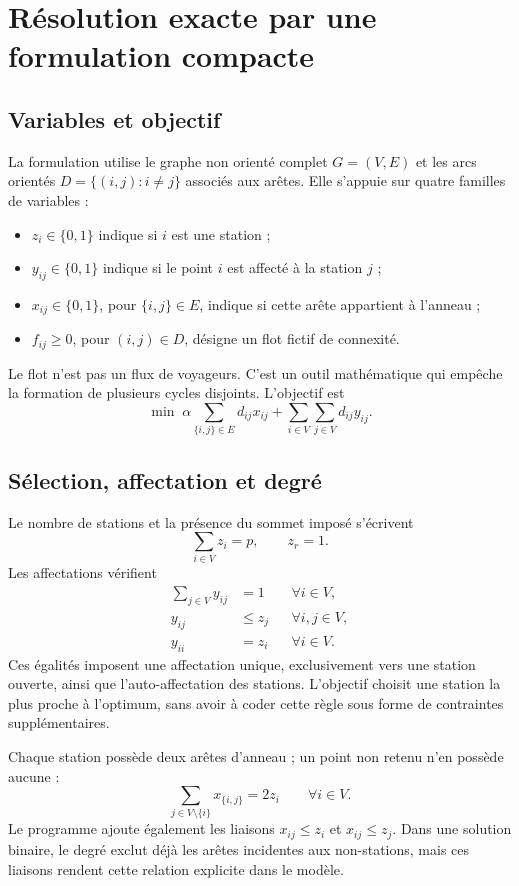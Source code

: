 \chapter{Résolution exacte par une formulation compacte}
\section{Variables et objectif}
La formulation utilise le graphe non orienté complet $G=(V,E)$ et les arcs
orientés $D=\{(i,j):i\ne j\}$ associés aux arêtes. Elle s'appuie sur quatre
familles de variables :
\begin{itemize}
\item $z_i\in\{0,1\}$ indique si $i$ est une station ;
\item $y_{ij}\in\{0,1\}$ indique si le point $i$ est affecté à la station $j$ ;
\item $x_{ij}\in\{0,1\}$, pour $\{i,j\}\in E$, indique si cette arête appartient à l'anneau ;
\item $f_{ij}\geq0$, pour $(i,j)\in D$, désigne un flot fictif de connexité.
\end{itemize}
Le flot n'est pas un flux de voyageurs. C'est un outil mathématique qui empêche
la formation de plusieurs cycles disjoints. L'objectif est
\begin{equation}
\min\;\alpha\sum_{\{i,j\}\in E}d_{ij}x_{ij}
       +\sum_{i\in V}\sum_{j\in V}d_{ij}y_{ij}.
\end{equation}

\section{Sélection, affectation et degré}
Le nombre de stations et la présence du sommet imposé s'écrivent
\begin{equation}
\sum_{i\in V}z_i=p,\qquad z_r=1.
\end{equation}
Les affectations vérifient
\begin{align}
\sum_{j\in V}y_{ij}&=1 &&\forall i\in V,\\
y_{ij}&\leq z_j &&\forall i,j\in V,\\
y_{ii}&=z_i &&\forall i\in V.
\end{align}
Ces égalités imposent une affectation unique, exclusivement vers une station
ouverte, ainsi que l'auto-affectation des stations. L'objectif choisit une station
la plus proche à l'optimum, sans avoir à coder cette règle sous forme de
contraintes supplémentaires.

Chaque station possède deux arêtes d'anneau ; un point non retenu n'en possède
aucune :
\begin{equation}
\sum_{j\in V\setminus\{i\}}x_{\{i,j\}}=2z_i\qquad\forall i\in V.
\end{equation}
Le programme ajoute également les liaisons $x_{ij}\leq z_i$ et $x_{ij}\leq z_j$.
Dans une solution binaire, le degré exclut déjà les arêtes incidentes aux
non-stations, mais ces liaisons rendent cette relation explicite dans le modèle.

